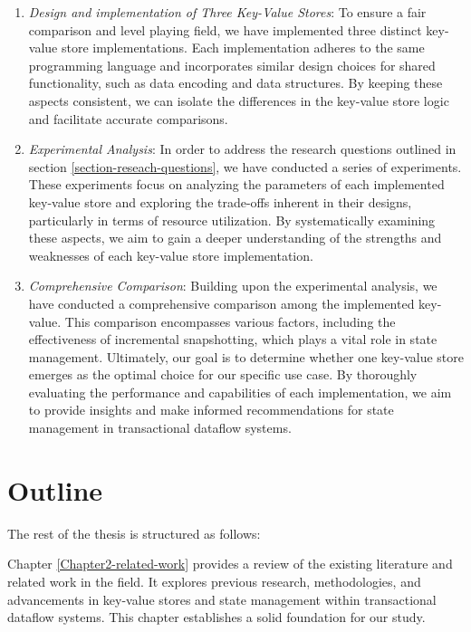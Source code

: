 \begin{enumerate}
    \item \textit{Design and implementation of Three Key-Value Stores}: To ensure a fair comparison and level playing field, we have implemented three distinct key-value store implementations. Each implementation adheres to the same programming language and incorporates similar design choices for shared functionality, such as data encoding and data structures. By keeping these aspects consistent, we can isolate the differences in the key-value store logic and facilitate accurate comparisons.
    
    \item \textit{Experimental Analysis}: In order to address the research questions outlined in section \ref{section-reseach-questions}, we have conducted a series of experiments. These experiments focus on analyzing the parameters of each implemented key-value store and exploring the trade-offs inherent in their designs, particularly in terms of resource utilization. By systematically examining these aspects, we aim to gain a deeper understanding of the strengths and weaknesses of each key-value store implementation.

    \item \textit{Comprehensive Comparison}: Building upon the experimental analysis, we have conducted a comprehensive comparison among the implemented key-value. This comparison encompasses various factors, including the effectiveness of incremental snapshotting, which plays a vital role in state management. Ultimately, our goal is to determine whether one key-value store emerges as the optimal choice for our specific use case. By thoroughly evaluating the performance and capabilities of each implementation, we aim to provide insights and make informed recommendations for state management in transactional dataflow systems.
\end{enumerate}

\section{Outline}

The rest of the thesis is structured as follows:

Chapter \ref{Chapter2-related-work} provides a review of the existing literature and related work in the field. It explores previous research, methodologies, and advancements in key-value stores and state management within transactional dataflow systems. This chapter establishes a solid foundation for our study.

